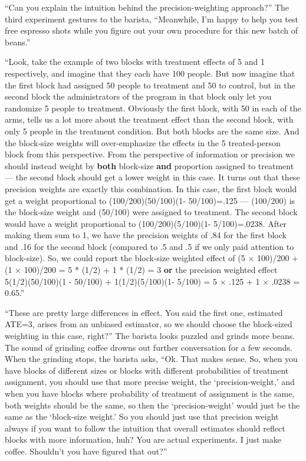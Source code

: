 \documentclass[
]{article}
\begin{document}
``Can you explain the intuition behind the precision-weighting approach?'' The third experiment gestures to the barista, ``Meanwhile, I'm happy to help you test free espresso shots while you figure out your own procedure for this new batch of beans.''

``Look, take the example of two blocks with treatment effects of 5 and 1
respectively, and imagine that they each have 100 people. But now imagine that
the first block had assigned 50 people to treatment and 50 to control, but in
the second block the administrators of the program in that block only let you
randomize 5 people to treatment. Obviously the first block, with 50 in each of
the arms, tells us a lot more about the treatment effect than the second block,
with only 5 people in the treatment condition. But both blocks are the same
size. And the block-size weights will over-emphasize the effects in the 5
treated-person block from this perspective. From the perspective of information
or precision we should instead weight by \textbf{both} block-size \textbf{and} proportion
assigned to treatment --- the second block should get a lower weight in this
case. It turns out that these precision weights are exactly this combination.
In this case, the first block would get a weight proportional to (100/200)(50/100)(1-
50/100)=.125 --- (100/200) is the block-size weight and (50/100) were assigned
to treatment. The second block would have a weight proportional to (100/200)(5/100)(1-
5/100)=.0238. After making them sum to 1, we have the precision weights of .84 for the first
block and .16 for the second block (compared to .5 and .5 if we only paid
attention to block-size). So, we could report the block-size weighted effect of (5 \(\times\)
100)/200 + (1 \(\times\) 100)/200 = 5 * (1/2) + 1 * (1/2) = 3 \textbf{or} the precision weighted effect 5(1/2)(50/100)(1 - 50/100) +
1(1/2)(5/100)(1- 5/100) = 5 \(\times\) .125 + 1 \(\times\) .0238 = 0.65.''

``These are pretty large differences in effect. You said the first one, estimated ATE=3, arises from an unbiased estimator, so we should choose the block-sized weighting in this case, right?'' The barista looks puzzled and grinds more beans. The sound of grinding coffee drowns out further conversation for a few seconds. When the grinding stops, the barista asks, ``Ok. That makes sense. So, when you have blocks of different sizes or blocks with different probabilities of treatment assignment, you should use that more precise weight, the `precision-weight,' and when you have blocks where probability of treatment of assignment is the same, both weights should be the same, so then the `precision-weight' would just be the same as the `block-size weight.' So you should just use that precision weight always if you want to follow the intuition that overall estimates should reflect blocks with more information, huh? You are actual experiments. I just make coffee. Shouldn't you have figured that out?''
\end{document}
